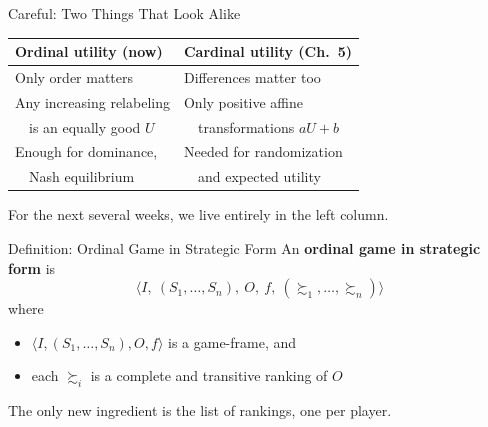 \begin{frame}{Careful: Two Things That Look Alike}
\centering
\begin{tabular}{|l|l|}
\hline
\textbf{Ordinal utility (now)} & \textbf{Cardinal utility (Ch.\ 5)} \\
\hline
Only order matters & Differences matter too \\
\hline
Any increasing relabeling & Only positive affine \\
\ \ is an equally good $U$ & \ \ transformations $aU+b$ \\
\hline
Enough for dominance, & Needed for randomization \\
\ \ Nash equilibrium & \ \ and expected utility \\
\hline
\end{tabular}
\bsk
\raggedright
\vfill
For the next several weeks, we live entirely in the left column.
\vspace{-0.4in}
\end{frame}


\begin{frame}{Definition: Ordinal Game in Strategic Form}
An \textbf{ordinal game in strategic form} is
$$\langle I,\ (S_1,\ldots,S_n),\ O,\ f,\ (\succsim_1,\ldots,\succsim_n)\rangle$$
where
\begin{itemize}
    \item $\langle I,(S_1,\ldots,S_n),O,f\rangle$ is a game-frame, and
    \item each $\succsim_i$ is a complete and transitive ranking of $O$
\end{itemize}
\vfill
The only new ingredient is the list of rankings, one per player.
\vspace{-0.5in}
\end{frame}

